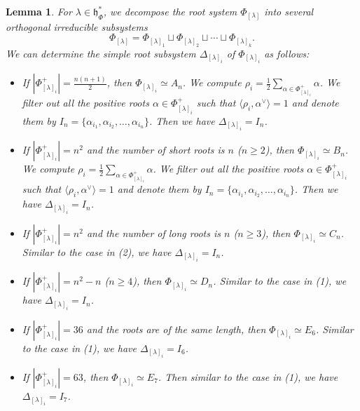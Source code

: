 \documentclass[reqno,12pt]{amsart}
\numberwithin{equation}{section}
\theoremstyle{plain}
\newtheorem{Lem}[Thm]{Lemma}
\theoremstyle{definition}
\newcommand{\lam}{\lambda}
\renewcommand{\geq}{\geqslant}
\begin{document}
\begin{Lem}
    For $\lam\in \mathfrak{h}_{\Phi}^*$, we decompose the root system $\Phi_{[\lam]}$ into several orthogonal irreducible subsystems
    $$\Phi_{[\lam]}=\Phi_{[\lam]_1}\sqcup \Phi_{[\lam]_2}\sqcup \cdots \sqcup \Phi_{[\lam]_k}.$$
 We can determine the simple root subsystem $\Delta_{[\lambda]_i}$ of $\Phi_{[\lam]_i}$ as follows:
\begin{itemize}
    \item[(1)] If $|\Phi^+_{[\lam]_i}|=\frac{n(n+1)}{2}$, then $\Phi_{[\lam]_i}\simeq A_n$. We compute $\rho_i=\frac{1}{2}\sum_{\alpha\in \Phi^+_{[\lam]_i}}\alpha$. We filter out all the positive roots  $\alpha \in \Phi^+_{[\lam]_i}$ such that $\langle \rho_i, \alpha^{\vee}\rangle=1$ and denote them by $I_n=\{\alpha_{i_1},\alpha_{i_2},\dots,\alpha_{i_n}\}$. Then we have $\Delta_{[\lambda]_i}=I_n$.
    \item[(2)] If $|\Phi^+_{[\lam]_i}|=n^2$ and the number of short roots is $n$ ($n\geq 2$), then $\Phi_{[\lam]_i}\simeq B_n$.
    We compute $\rho_i=\frac{1}{2}\sum_{\alpha\in \Phi^+_{[\lam]_i}}\alpha$. We filter out all the positive roots  $\alpha \in \Phi^+_{[\lam]_i}$ such that $\langle \rho_i, \alpha^{\vee}\rangle=1$ and denote them by $I_{n}=\{\alpha_{i_1},\alpha_{i_2},\dots,\alpha_{i_{n}}\}$.  Then we have $\Delta_{[\lambda]_i}=I_{n}$.
      
    \item[(3)] If $|\Phi^+_{[\lam]_i}|=n^2$ and the number of long roots is $n$ ($n\geq 3$), then $\Phi_{[\lam]_i}\simeq C_n$. Similar to the case in (2), we have $\Delta_{[\lambda]_i}=I_{n}$.
    
       \item[(4)] If $|\Phi^+_{[\lam]_i}|=n^2-n$ ($n\geq 4$), then $\Phi_{[\lam]_i}\simeq D_n$.  Similar to the case in (1), we have $\Delta_{[\lambda]_i}=I_{n}$.
       
\item[(5)] If $|\Phi^+_{[\lam]_i}|=36$ and the roots are of the same length, then $\Phi_{[\lam]_i}\simeq E_6$. Similar to the case in (1), we have $\Delta_{[\lambda]_i}=I_{6}$.

\item[(6)] If $|\Phi^+_{[\lam]_i}|=63$, then $\Phi_{[\lam]_i}\simeq E_7$. Then similar to the case in (1), we have $\Delta_{[\lambda]_i}=I_{7}$.


    
\end{itemize}




    
\end{Lem}
\end{document}
